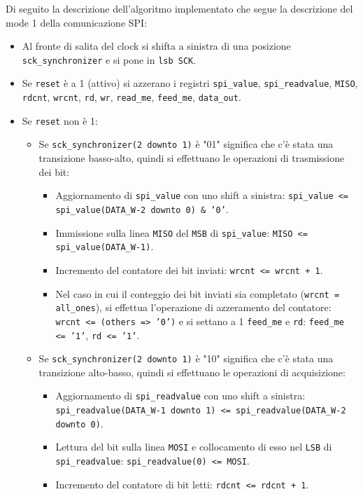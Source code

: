 \documentclass[titlepage]{report}
\begin{document}
			Di seguito la descrizione dell'algoritmo implementato che segue la descrizione del mode 1 della	comunicazione SPI:
			\begin{itemize}
				\item Al fronte di salita del clock si shifta a sinistra di una posizione \texttt{sck\_synchronizer} e si pone in \texttt{lsb SCK}.
				\item Se \texttt{reset} è a 1 (attivo) si azzerano i registri \texttt{spi\_value}, \texttt{spi\_readvalue}, \texttt{MISO}, \texttt{rdcnt}, \texttt{wrcnt}, \texttt{rd}, \texttt{wr}, \texttt{read\_me}, \texttt{feed\_me}, \texttt{data\_out}.
				\item Se \texttt{reset} non è 1:
				\begin{itemize}
					\item Se \texttt{sck\_synchronizer(2 downto 1)} è "01" significa che c'è stata una transizione basso-alto, quindi si effettuano le operazioni di trasmissione dei bit:
					\begin{itemize}
						\item Aggiornamento di \texttt{spi\_value} con uno shift a sinistra: \texttt{spi\_value <= spi\_value(DATA\_W-2 downto 0) \& '0'}.
						\item Immissione sulla linea \texttt{MISO} del \texttt{MSB} di \texttt{spi\_value}: \texttt{MISO <= spi\_value(DATA\_W-1)}.
						\item Incremento del contatore dei bit inviati: \texttt{wrcnt <= wrcnt + 1}.
						\item Nel caso in cui il conteggio dei bit inviati sia completato (\texttt{wrcnt = all\_ones}), si effettua l'operazione di azzeramento del contatore: \texttt{wrcnt <= (others => '0')} e si settano a 1 \texttt{feed\_me} e \texttt{rd}: \texttt{feed\_me <= '1'}, \texttt{rd <= '1'}.
					\end{itemize}
					\item Se \texttt{sck\_synchronizer(2 downto 1)} è "10" significa che c'è stata una transizione alto-basso, quindi si effettuano le operazioni di acquisizione:
					\begin{itemize}
						\item Aggiornamento di \texttt{spi\_readvalue} con uno shift a sinistra: \texttt{spi\_readvalue(DATA\_W-1 downto 1) <= spi\_readvalue(DATA\_W-2 downto 0)}.
						\item Lettura del bit sulla linea \texttt{MOSI} e collocamento di esso nel \texttt{LSB} di \texttt{spi\_readvalue}: \texttt{spi\_readvalue(0) <= MOSI}.
						\item Incremento del contatore di bit letti: \texttt{rdcnt <= rdcnt + 1}.

\end{itemize}
\end{itemize}
\end{itemize}
\end{document}
